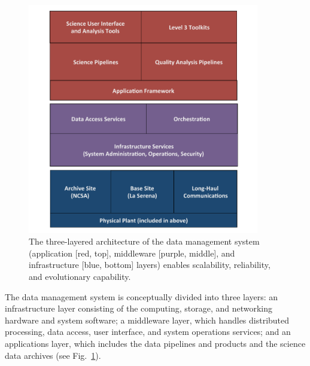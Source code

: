 \documentclass[11pt,twoside]{article}
\begin{document}
\begin{figure}[!t]
%
%
\begin{center}
\includegraphics[width=0.9\textwidth,clip]{DMsandwich.pdf}
\end{center}
\caption{The three-layered architecture of the data management system
(application [red, top], middleware [purple, middle], and infrastructure [blue, bottom] layers) enables scalability, reliability, and evolutionary capability.}
\label{Fig:DM1}
\end{figure}

The data management system is conceptually divided into three layers: an
infrastructure layer consisting of the computing, storage, and
networking hardware and system software; a middleware layer, which
handles distributed processing, data access, user interface, and
system operations services; and an applications layer, which includes
the data pipelines and products and the science data archives (see
Fig.~\ref{Fig:DM1}).
\end{document}
